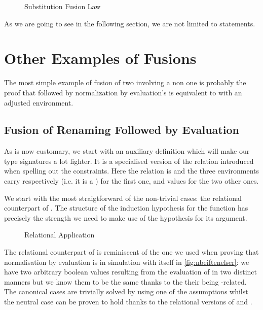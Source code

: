 \begin{figure}[h]
\caption{Substitution Fusion Law\label{fig:subsub}}
\end{figure}

As we are going to see in the following section, we are not limited
to  statements.

\section{Other Examples of Fusions}

The most simple example of fusion of two  involving a non 
one is probably the proof that  followed by normalization by evaluation's
 is equivalent to  with an adjusted environment.

\subsection{Fusion of Renaming Followed by Evaluation}
\label{sec:fusionrennbe}

As is now customary, we start with an auxiliary definition which will make our
type signatures a lot lighter. It is a specialised version of the relation 
introduced when spelling out the  constraints. Here the relation is 
and the three environments carry respectively  (i.e. it is a ) for
the first one, and  values for the two other ones.


We start with the most straigtforward of the non-trivial cases: the relational
counterpart of . The  structure of the induction hypothesis
for the function has precisely the strength we need to make use of the hypothesis
for its argument.

\begin{figure}[h]
\caption{Relational Application}
\end{figure}

The relational counterpart of  is reminiscent of the one we used when
proving that normalisation by evaluation is in simulation with itself in
\cref{fig:nbeiftenelser}: we have two arbitrary boolean values resulting from the
evaluation of  in two distinct manners but we know them to be the same thanks
to the their being -related. The canonical cases are trivially solved by
using one of the assumptions whilst the neutral case can be proven to hold thanks
to the relational versions of  and .

